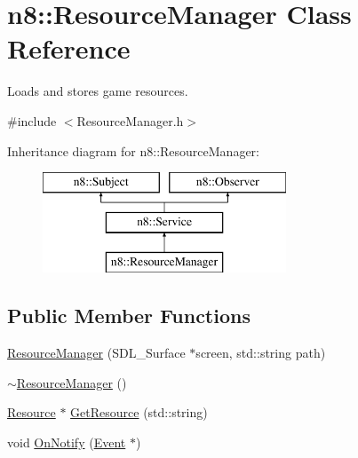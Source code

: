 \hypertarget{classn8_1_1_resource_manager}{\section{n8\-:\-:Resource\-Manager Class Reference}
\label{classn8_1_1_resource_manager}
}


Loads and stores game resources.  




{\ttfamily \#include $<$Resource\-Manager.\-h$>$}

Inheritance diagram for n8\-:\-:Resource\-Manager\-:\begin{figure}[H]
\begin{center}
\leavevmode
\includegraphics[height=3.000000cm]{classn8_1_1_resource_manager}
\end{center}
\end{figure}
\subsection*{Public Member Functions}
\begin{DoxyCompactItemize}
\item 
\hyperlink{classn8_1_1_resource_manager_a047ca08ea13d151e5c5162e4fae1c785}{Resource\-Manager} (S\-D\-L\-\_\-\-Surface $\ast$screen, std\-::string path)
\item 
\hyperlink{classn8_1_1_resource_manager_a06074da1d8fa5b1eb26e8a6996c6696e}{$\sim$\-Resource\-Manager} ()
\item 
\hyperlink{classn8_1_1_resource}{Resource} $\ast$ \hyperlink{classn8_1_1_resource_manager_a0d9c23c34a44338e53add156a88260bd}{Get\-Resource} (std\-::string)
\item 
void \hyperlink{classn8_1_1_resource_manager_ace97033b439ac0954cf2fc45a79081c9}{On\-Notify} (\hyperlink{classn8_1_1_event}{Event} $\ast$)
\end{DoxyCompactItemize}
